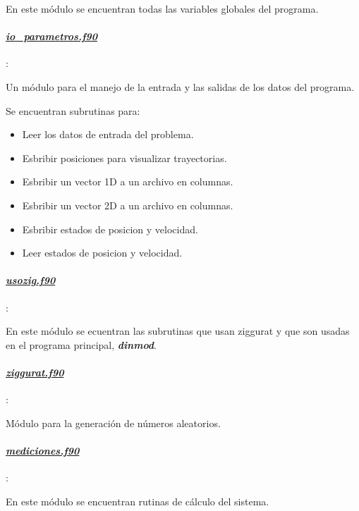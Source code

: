 En este  m\'odulo se encuentran  todas las variables globales del programa.
	
\paragraph{\underline{\textit{io\_parametros.f90}}}:

Un m\'odulo para el manejo de la entrada y las salidas de los datos del programa.

Se encuentran  subrutinas para:
\begin{itemize}
 \item Leer los datos de entrada del problema.

 \item Esbribir posiciones para visualizar trayectorias.

 \item Esbribir un vector 1D a un archivo en columnas.

 \item Esbribir un vector 2D a un archivo en columnas.

 \item Esbribir estados de posicion y velocidad.

 \item Leer estados de posicion y velocidad.

\end{itemize}

\paragraph{\underline{\textit{usozig.f90}}}: 

En este m\'odulo se ecuentran las subrutinas que usan ziggurat y que
son usadas en el programa principal, \textbf{\textit{dinmod}}.
					
\paragraph{\underline{\textit{ziggurat.f90}}}:

Módulo para la generaci\'on de n\'umeros aleatorios. 

\paragraph{\underline{\textit{mediciones.f90}}}:

En este m\'odulo  se encuentran rutinas de c\'alculo del
sistema.


